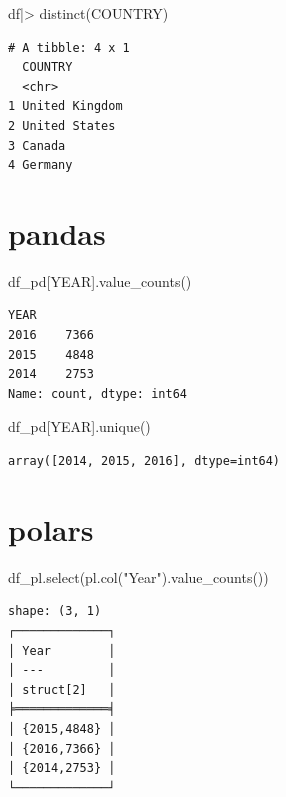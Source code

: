 \documentclass[
  letterpaper,
  DIV=11,
  numbers=noendperiod]{scrreprt}
\newenvironment{Shaded}{\begin{snugshade}}{\end{snugshade}}
\newcommand{\FunctionTok}[1]{\textcolor[rgb]{0.28,0.35,0.67}{#1}}
\newcommand{\NormalTok}[1]{\textcolor[rgb]{0.00,0.23,0.31}{#1}}
\newcommand{\SpecialCharTok}[1]{\textcolor[rgb]{0.37,0.37,0.37}{#1}}
\newcommand{\StringTok}[1]{\textcolor[rgb]{0.13,0.47,0.30}{#1}}
\begin{document}
\begin{Shaded}
\begin{Highlighting}[]
\NormalTok{df}\SpecialCharTok{|\textgreater{}} \FunctionTok{distinct}\NormalTok{(COUNTRY)}
\end{Highlighting}
\end{Shaded}

\begin{verbatim}
# A tibble: 4 x 1
  COUNTRY       
  <chr>         
1 United Kingdom
2 United States 
3 Canada        
4 Germany       
\end{verbatim}

\section{pandas}

\begin{Shaded}
\begin{Highlighting}[]
\NormalTok{df\_pd[}\StringTok{\textquotesingle{}YEAR\textquotesingle{}}\NormalTok{].value\_counts()}
\end{Highlighting}
\end{Shaded}

\begin{verbatim}
YEAR
2016    7366
2015    4848
2014    2753
Name: count, dtype: int64
\end{verbatim}

\begin{Shaded}
\begin{Highlighting}[]
\NormalTok{df\_pd[}\StringTok{\textquotesingle{}YEAR\textquotesingle{}}\NormalTok{].unique()}
\end{Highlighting}
\end{Shaded}

\begin{verbatim}
array([2014, 2015, 2016], dtype=int64)
\end{verbatim}

\section{polars}

\begin{Shaded}
\begin{Highlighting}[]
\NormalTok{df\_pl.select(pl.col(}\StringTok{"Year"}\NormalTok{).value\_counts())}
\end{Highlighting}
\end{Shaded}

\begin{verbatim}
shape: (3, 1)
┌─────────────┐
│ Year        │
│ ---         │
│ struct[2]   │
╞═════════════╡
│ {2015,4848} │
│ {2016,7366} │
│ {2014,2753} │
└─────────────┘
\end{verbatim}
\end{document}
